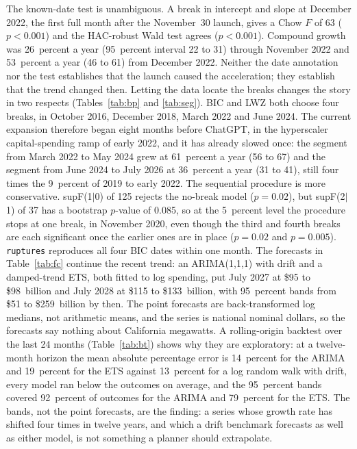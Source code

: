 The known-date test is unambiguous. A break in intercept and slope at December 2022, the first full month after the November~30 launch, gives a Chow $F$ of 63 ($p < 0.001$) and the HAC-robust Wald test agrees ($p < 0.001$). Compound growth was 26~percent a year (95~percent interval 22 to 31) through November 2022 and 53~percent a year (46 to 61) from December 2022. Neither the date annotation nor the test establishes that the launch caused the acceleration; they establish that the trend changed then. Letting the data locate the breaks changes the story in two respects (Tables~\ref{tab:bp} and \ref{tab:seg}). BIC and LWZ both choose four breaks, in October 2016, December 2018, March 2022 and June 2024. The current expansion therefore began eight months before ChatGPT, in the hyperscaler capital-spending ramp of early 2022, and it has already slowed once: the segment from March 2022 to May 2024 grew at 61~percent a year (56 to 67) and the segment from June 2024 to July 2026 at 36~percent a year (31 to 41), still four times the 9~percent of 2019 to early 2022. The sequential procedure is more conservative. supF(1$|$0) of 125 rejects the no-break model ($p = 0.02$), but supF(2$|$1) of 37 has a bootstrap $p$-value of 0.085, so at the 5~percent level the procedure stops at one break, in November 2020, even though the third and fourth breaks are each significant once the earlier ones are in place ($p = 0.02$ and $p = 0.005$). \texttt{ruptures} reproduces all four BIC dates within one month. The forecasts in Table~\ref{tab:fc} continue the recent trend: an ARIMA(1,1,1) with drift and a damped-trend ETS, both fitted to log spending, put July 2027 at \$95 to \$98~billion and July 2028 at \$115 to \$133~billion, with 95~percent bands from \$51 to \$259~billion by then. The point forecasts are back-transformed log medians, not arithmetic means, and the series is national nominal dollars, so the forecasts say nothing about California megawatts. A rolling-origin backtest over the last 24 months (Table~\ref{tab:bt}) shows why they are exploratory: at a twelve-month horizon the mean absolute percentage error is 14~percent for the ARIMA and 19~percent for the ETS against 13~percent for a log random walk with drift, every model ran below the outcomes on average, and the 95~percent bands covered 92~percent of outcomes for the ARIMA and 79~percent for the ETS. The bands, not the point forecasts, are the finding: a series whose growth rate has shifted four times in twelve years, and which a drift benchmark forecasts as well as either model, is not something a planner should extrapolate.

